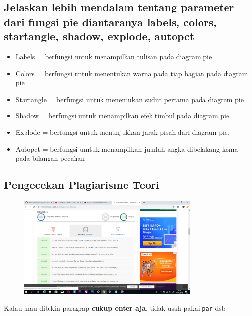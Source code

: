 \subsection{Jelaskan lebih mendalam tentang parameter dari fungsi pie diantaranya labels, colors, startangle, shadow, explode, autopct}
\begin{itemize}
    \item Labels = berfungsi untuk menampilkan tulisan pada diagram pie
    \item Colors = berfungsi untuk menentukan warna pada tiap bagian pada diagram pie
    \item Startangle = berfungsi untuk menentukan sudut pertama pada diagram pie
    \item Shadow = berfungsi untuk menampilkan efek timbul pada diagram pie
    \item Explode = berfungsi untuk menunjukkan jarak pisah dari diagram pie.
    \item Autopct = berfungsi umtuk menampilkan jumlah angka dibelakang koma pada bilangan pecahan
\end{itemize}

\subsection{Pengecekan Plagiarisme Teori}
\begin{figure}[H]
	\includegraphics[width=9cm]{figures/6/Teori/1174004/Plagiat.png}
	\centering
\end{figure}

Kalau mau dibikin paragrap \textbf{cukup enter aja}, tidak usah pakai \verb|par| dsb



